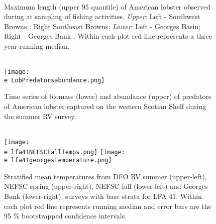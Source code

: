 \documentclass[11pt]{article}
\newcommand{\D}{.}
\newcommand{\e}{/backup/bio_data/bio.lobster/figures/} %
\begin{document}
\begin{figure}

\\
                    
\caption{Maximum length (upper 95 quantile) of American lobster observed during at sampling of fishing activities. \emph{Upper}: Left - Southwest Browns ; Right Southeast Browns; \emph{Lower}: Left - Georges Basin; Right - Georges Bank . Within each plot red line represents a three year running median.}

\end{figure}




\begin{figure}
\centering
    \\
    \texttt{[image: \\e LobPredatorsabundance.png]}\\
    \caption{Time series of biomass (lower) and abundance (upper) of predators of American lobster captured on the western Scotian Shelf during the summer RV survey.}

\end{figure}


\begin{figure}

  \\
    \texttt{[image: \\e lfa41NEFSCFallTemps.png]}
    \texttt{[image: \\e lfa41georgestemperature.png]}\\
   
    \caption{Stratified mean temperatures from DFO RV summer (upper-left), NEFSC spring (upper-right), NEFSC fall (lower-left) and Georges Bank (lower-right), surveys with base strata for LFA 41. Within each plot red line represents running median and error bars are the 95 \% bootstrapped confidence intervals.}

\end{figure}
\end{document}
